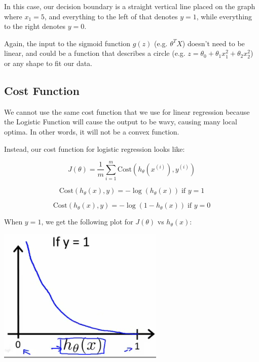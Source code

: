 \documentclass[UTF8]{article}
\begin{document}
In this case, our decision boundary is a straight vertical line placed on the graph where $x_1=5$, and everything to the left of that denotes $y = 1$, while everything to the right denotes $y = 0$.

Again, the input to the sigmoid function $g(z)$ (e.g. $\theta^TX$) doesn't need to be linear, and could be a function that describes a circle (e.g. $z=\theta_0+\theta_1x^2_1+\theta_2x^2_2$) or any shape to fit our data.

\subsection{Cost Function}

We cannot use the same cost function that we use for linear regression because the Logistic Function will cause the output to be wavy, causing many local optima. In other words, it will not be a convex function.

Instead, our cost function for logistic regression looks like:

\[ J(\theta) = \dfrac{1}{m} \sum_{i=1}^m \mathrm{Cost}(h_\theta(x^{(i)}),y^{(i)}) \]

\[ \mathrm{Cost}(h_\theta(x),y) = -\log(h_\theta(x)) \;  \text{if } y = 1 \]

\[ \mathrm{Cost}(h_\theta(x),y) = -\log(1-h_\theta(x)) \;  \text{if } y = 0 \]

When $y = 1$, we get the following plot for $J(\theta)$ vs $h_\theta(x)$:

\includegraphics[width = \textwidth]{NotePics/6_4_1.png}
\end{document}
